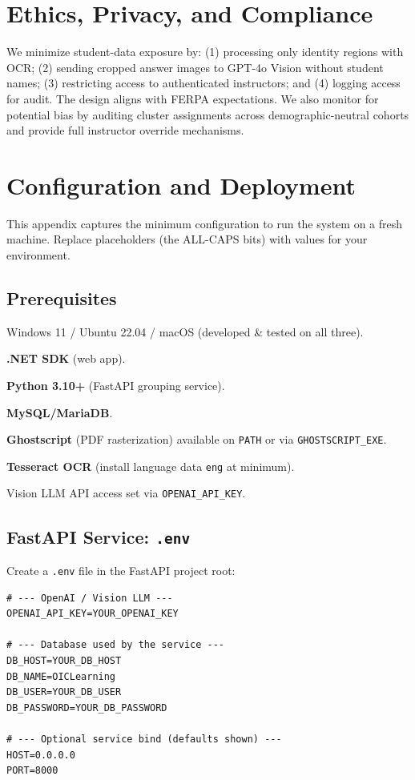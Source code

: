 \documentclass[ms,twoside,print]{nuthesis}
\begin{document}
\chapter{Ethics, Privacy, and Compliance}
We minimize student-data exposure by: (1) processing only identity regions with OCR; (2) sending cropped answer images to GPT-4o Vision without student names; (3) restricting access to authenticated instructors; and (4) logging access for audit. The design aligns with FERPA expectations\cite{FERPA1974}. We also monitor for potential bias by auditing cluster assignments across demographic-neutral cohorts and provide full instructor override mechanisms.

\appendix

\chapter{Configuration and Deployment}\label{app:config}

This appendix captures the minimum configuration to run the system on a fresh machine.
Replace placeholders (the ALL-CAPS bits) with values for your environment.

\lstset{basicstyle=\ttfamily\footnotesize,breaklines=true,columns=fullflexible}

\section{Prerequisites}
\begin{compactitem}
  \item Windows 11 / Ubuntu 22.04 / macOS (developed \& tested on all three).
  \item \textbf{.NET SDK} (web app).
  \item \textbf{Python 3.10+} (FastAPI grouping service).
  \item \textbf{MySQL/MariaDB}.
  \item \textbf{Ghostscript} (PDF rasterization) available on \texttt{PATH} or via \texttt{GHOSTSCRIPT\_EXE}.
  \item \textbf{Tesseract OCR} (install language data \texttt{eng} at minimum).
  \item Vision LLM API access set via \texttt{OPENAI\_API\_KEY}.
\end{compactitem}

\section{FastAPI Service: \texttt{.env}}
Create a \texttt{.env} file in the FastAPI project root:
\begin{lstlisting}
# --- OpenAI / Vision LLM ---
OPENAI_API_KEY=YOUR_OPENAI_KEY

# --- Database used by the service ---
DB_HOST=YOUR_DB_HOST
DB_NAME=OICLearning
DB_USER=YOUR_DB_USER
DB_PASSWORD=YOUR_DB_PASSWORD

# --- Optional service bind (defaults shown) ---
HOST=0.0.0.0
PORT=8000
\end{lstlisting}
\end{document}
